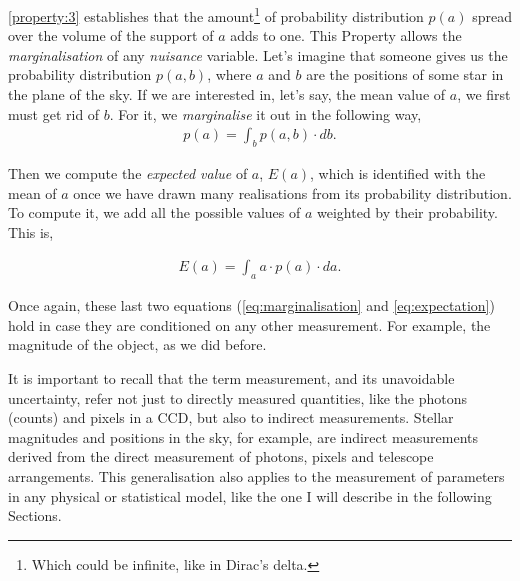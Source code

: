 \ref{property:3} establishes that the amount\footnote{Which could be infinite, like in Dirac's delta.} of probability distribution $p(a)$ spread over the volume of the support of $a$ adds to one. This Property allows the \emph{marginalisation} of any \emph{nuisance} variable. Let's imagine that someone gives us the probability distribution $p(a,b)$, where $a$ and $b$ are the positions of some star in the plane of the sky. If we are interested in, let's say, the mean value of $a$, we first must get rid of $b$. For it, we \emph{marginalise} it out in the following way,
\begin{align}
\label{eq:marginalisation}
p(a)=\int_b p(a,b)\cdot db.
\end{align}



Then we compute the \emph{expected value} of $a$, $E(a)$, which is identified with the mean of $a$ once we have drawn many realisations from its probability distribution. To compute it, we add all the possible values of $a$ weighted by their probability. This is,

\begin{align}
\label{eq:expectation}
E(a)=\int_a a\cdot p(a)\cdot da.
\end{align}

Once again, these last two equations (\ref{eq:marginalisation} and \ref{eq:expectation}) hold in case they are conditioned on any other measurement. For example, the magnitude of the object, as we did before. 

It is important to recall that the term measurement, and its unavoidable uncertainty, refer not just to directly measured quantities, like the photons (counts) and pixels in a CCD, but also to indirect measurements. Stellar magnitudes and positions in the sky, for example, are indirect measurements derived from the direct measurement of photons, pixels and telescope arrangements. This generalisation also applies to the measurement of parameters in any physical or statistical model, like the one I will describe in the following Sections.

